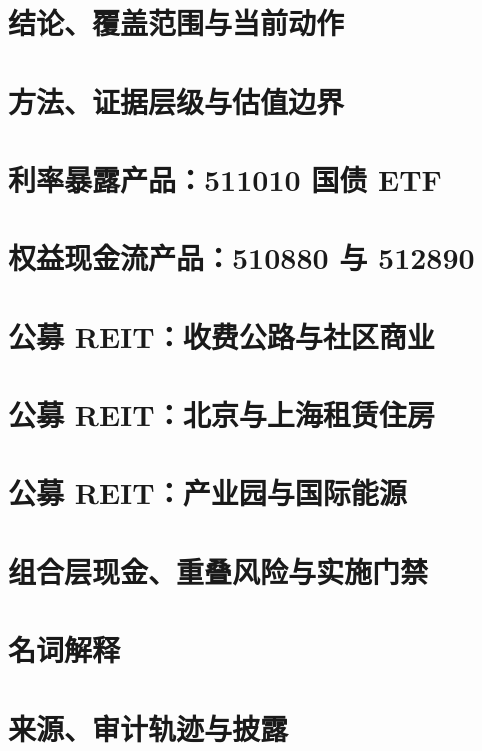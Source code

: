 \documentclass[a4paper,11pt,openany,fontset=none]{ctexrep}
\begin{document}
\astockcover

\tableofcontents
\clearpage

\chapter{结论、覆盖范围与当前动作}


\chapter{方法、证据层级与估值边界}


\chapter{利率暴露产品：511010 国债 ETF}


\chapter{权益现金流产品：510880 与 512890}


\chapter{公募 REIT：收费公路与社区商业}


\chapter{公募 REIT：北京与上海租赁住房}


\chapter{公募 REIT：产业园与国际能源}


\chapter{组合层现金、重叠风险与实施门禁}


\appendix
\chapter{名词解释}


\chapter{来源、审计轨迹与披露}

\end{document}
